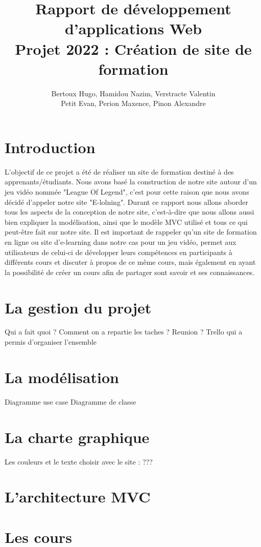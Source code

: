 \documentclass[a4paper,10pt]{article}
\title{
Rapport de développement d'applications Web\\
Projet 2022 : Création de site de formation
}
\author{
Bertoux Hugo, Hamidou Nazim, Verstracte Valentin\\
Petit Evan, Perion Maxence, Pinon Alexandre
}
\date{}
\begin{document}
\maketitle 
\tableofcontents

\newpage
\section{Introduction}
L'objectif de ce projet a été de réaliser un site de formation destiné à des apprenants/étudiants. Nous avons basé la construction de notre site autour d'un jeu vidéo nommée "League Of Legend", c'est pour cette raison que nous avons décidé d'appeler notre site "E-lolning". 
Durant ce rapport nous allons aborder tous les aspects de la conception de notre site, c'est-à-dire que nous allons aussi bien expliquer la modélisation, ainsi que le modèle MVC utilisé et tous ce qui peut-être fait sur notre site. Il est important de rappeler qu'un site de formation en ligne ou site d'e-learning dans notre cas pour un jeu vidéo, permet aux utilisateurs de celui-ci de développer leurs compétences en participants à différents cours et discuter à propos de ce même cours, mais également en ayant la possibilité de créer un cours afin de partager sont savoir et ses connaissances. 

\section{La gestion du projet}
Qui a fait quoi ? Comment on a repartie les taches ? Reunion ? Trello qui a permis d'organiser l'ensemble

\section{La modélisation}
Diagramme use case
Diagramme de classe

\section{La charte graphique}
Les couleurs et le texte choisir avec le site : ???

\section{L'architecture MVC}

\section{Les cours}
\end{document}
